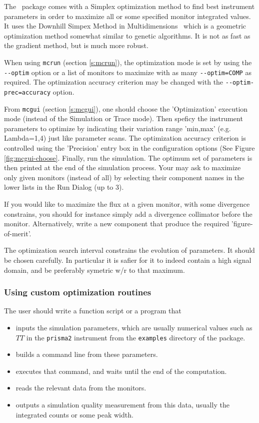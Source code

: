 The \MCS\ package comes with a Simplex optimization method to find best instrument parameters in order to maximize all or some specified monitor integrated values. It uses the Downhill Simpex Method in Multidimensions~\cite{neldermead,NumRecip} which is a geometric optimization method somewhat similar to genetic algorithms. It is not as fast as the gradient method, but is much more robust.

When using \verb+mcrun+ (section \ref{s:mcrun}), the optimization mode is set by using the
\verb+--optim+ option or a list of monitors to maximize with as many
\verb+--optim=COMP+ as required. The optimization accuracy criterion
may be changed with the \verb+--optim-prec=accuracy+ option.

From \verb+mcgui+ (section \ref{s:mcgui}), one should choose the
'Optimization' execution mode (instead of the Simulation or Trace
mode). Then speficy the instrument parameters to optimize by
indicating their variation range 'min,max' (e.g. Lambda=1,4) just like
parameter scans. The optimization accuracy criterion is controlled
using the 'Precision' entry box in the configuration options (See
Figure \ref{fig:mcgui-choose}. Finally, run the simulation. The optimum
set of parameters is then printed at the end of the simulation
process. Your may ask to maximize only given monitors (instead of all)
by selecting their component names in the lower lists in the Run Dialog (up to 3).

If you would like to maximize the flux at a given monitor, with some
divergence constrains, you should for instance simply add a divergence
collimator before the monitor. Alternatively, write a new component
that produce the required 'figure-of-merit'.

The optimization search interval constrains the evolution of parameters. It should be chosen carefully. In particular it is safier for it to indeed contain a high signal domain, and be preferably symetric w/r to that maximum.

\subsubsection{Using custom optimization routines}
The user should write a function script or a program that
\begin{itemize}
\item inputs the simulation parameters, which are usually numerical values such as $TT$ in the \verb+prisma2+ instrument from the \verb+examples+ directory of the package.
\item builds a command line from these parameters.
\item executes that command, and waits until the end of the computation.
\item reads the relevant data from the monitors.
\item outputs a simulation quality measurement from this data, usually the integrated counts or some peak width.
\end{itemize}

